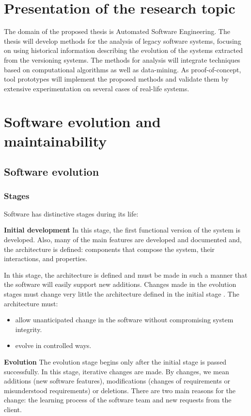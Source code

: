 \documentclass[12pt]{mitthesis}
\begin{document}
\tableofcontents

\pagestyle{plain}

\chapter{Presentation of the research topic}

The domain of the proposed thesis is Automated Software Engineering. The thesis will develop methods for the analysis of legacy software systems, focusing on using historical information describing the evolution of the systems extracted from the versioning systems. 
The methods for analysis will integrate techniques based on computational algorithms as well as data-mining. As proof-of-concept, tool prototypes will implement the proposed methods and validate them by extensive experimentation on several cases of real-life systems.

\chapter{Software evolution and maintainability}
\section{Software evolution}
\subsection{Stages}
\label{stages}
Software has distinctive stages during its life:

\textbf{Initial development} In this stage, the first functional version of the system is developed. Also, many of the main features are developed and documented and, the architecture is defined: components that compose the system, their interactions, and properties. 

In this stage, the architecture is defined and must be made in such a manner that the software will easily support new additions. Changes made in the evolution stages must change very little the architecture defined in the initial stage \cite{model-bennett}.  The architecture must:
\begin{itemize}
\item allow unanticipated change in the software without compromising system integrity.
\item evolve in controlled ways. \cite{Bennett}
\end{itemize}

\textbf{Evolution} The evolution stage begins only after the initial stage is passed successfully. In this stage, iterative changes are made. By changes, we mean additions (new software features), modifications (changes of requirements or misunderstood requirements) or deletions. There are two main reasons for the change: the learning process of the software team and new requests from the client.
\end{document}
